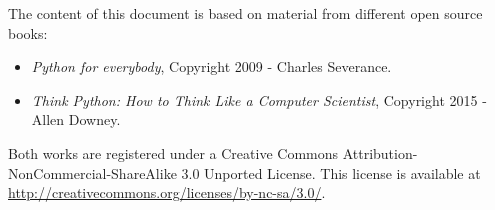 \begin{disclaimer}
\begin{footnotesize}
The content of this document is based on material from different open source books:
\begin{itemize}[nosep]
\item \textit{Python for everybody}, Copyright 2009 - Charles Severance. 
\item \textit{Think Python: How to Think Like a Computer Scientist}, Copyright 2015 - Allen Downey.
\end{itemize}
Both works are registered under a Creative Commons Attribution-NonCommercial-ShareAlike 3.0 Unported License. This license is available at \url{http://creativecommons.org/licenses/by-nc-sa/3.0/}.

\doclicenseThis
\end{footnotesize}
\end{disclaimer}
